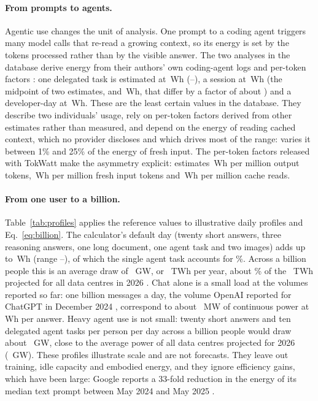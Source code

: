 \documentclass[11pt]{article}
\newcommand{\Wh}{\,Wh}
\begin{document}
\paragraph{From prompts to agents.}
Agentic use changes the unit of analysis. One prompt to a coding agent triggers many model calls that re-read a growing context, so its energy is set by the tokens processed rather than by the visible answer. The two analyses in the database derive energy from their authors' own coding-agent logs and per-token factors \citep{couch2026agents,hausfather2026agentic}: one delegated task is estimated at \Wh{} (--), a session at \Wh{} (the midpoint of two estimates, \sessionLo{} and \sessionHi\Wh, that differ by a factor of about \sessionRatio) and a developer-day at \Wh. These are the least certain values in the database. They describe two individuals' usage, rely on per-token factors derived from other estimates rather than measured, and depend on the energy of reading cached context, which no provider discloses and which drives most of the range: \citet{hausfather2026agentic} varies it between 1\% and 25\% of the energy of fresh input. The per-token factors released with TokWatt make the asymmetry explicit: \citet{couch2026agents} estimates \tfOut\Wh{} per million output tokens, \tfIn\Wh{} per million fresh input tokens and \tfCache\Wh{} per million cache reads.

\paragraph{From one user to a billion.}
Table~\ref{tab:profiles} applies the reference values to illustrative daily profiles and Eq.~\eqref{eq:billion}. The calculator's default day (twenty short answers, three reasoning answers, one long document, one agent task and two images) adds up to \exDayWh\Wh{} (range \exDayLo--\exDayHi), of which the single agent task accounts for \exAgentShare\%. Across a billion people this is an average draw of \exDayGW~GW, or \exDayTWh~TWh per year, about \exDayPctDC\% of the \gartnerTwhB~TWh projected for all data centres in 2026 \citep{gartner2026dc}. Chat alone is a small load at the volumes reported so far: one billion messages a day, the volume OpenAI reported for ChatGPT in December 2024 \citep{odonnell2025math}, correspond to about \chatgptMW~MW of continuous power at \Wh{} per answer. Heavy agent use is not small: twenty short answers and ten delegated agent tasks per person per day across a billion people would draw about \devGW~GW, close to the average power of all data centres projected for 2026 (\dcAvgGW~GW). These profiles illustrate scale and are not forecasts. They leave out training, idle capacity and embodied energy, and they ignore efficiency gains, which have been large: Google reports a 33-fold reduction in the energy of its median text prompt between May 2024 and May 2025 \citep{elsworth2025measuring}.
\end{document}
